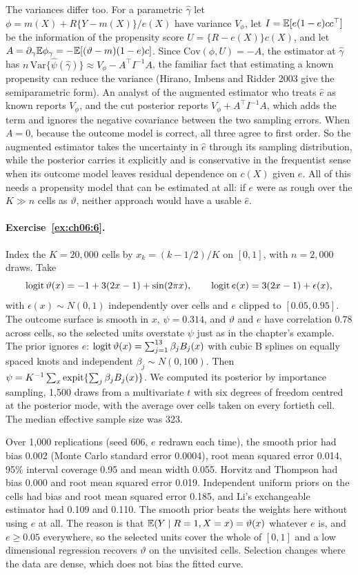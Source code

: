 The variances differ too. For a parametric $\hat\gamma$ let $\phi = m(X) + R\{Y - m(X)\}/e(X)$ have variance $V_\phi$, let $I = \mathbb{E}[e(1 - e)cc^\top]$ be the information of the propensity score $U = \{R - e(X)\}c(X)$, and let $A = \partial_\gamma\mathbb{E}\phi_\gamma = -\mathbb{E}[(\vartheta - m)(1 - e)c]$. Since $\mathrm{Cov}(\phi, U) = -A$, the estimator at $\hat\gamma$ has $n\,\mathrm{Var}\{\hat\psi(\hat\gamma)\} \approx V_\phi - A^\top I^{-1}A$, the familiar fact that estimating a known propensity can reduce the variance (Hirano, Imbens and Ridder 2003 give the semiparametric form). An analyst of the augmented estimator who treats $\hat e$ as known reports $V_\phi$, and the cut posterior reports $V_\phi + A^\top I^{-1}A$, which adds the term and ignores the negative covariance between the two sampling errors. When $A = 0$, because the outcome model is correct, all three agree to first order. So the augmented estimator takes the uncertainty in $\hat e$ through its sampling distribution, while the posterior carries it explicitly and is conservative in the frequentist sense when its outcome model leaves residual dependence on $c(X)$ given $e$. All of this needs a propensity model that can be estimated at all: if $e$ were as rough over the $K \gg n$ cells as $\vartheta$, neither approach would have a usable $\hat e$.

\paragraph{Exercise~\ref{ex:ch06:6}.} Index the $K = 20{,}000$ cells by $x_k = (k - 1/2)/K$ on $[0, 1]$, with $n = 2{,}000$ draws. Take
\[
\operatorname{logit}\vartheta(x) = -1 + 3(2x - 1) + \sin(2\pi x), \qquad \operatorname{logit} e(x) = 3(2x - 1) + \epsilon(x),
\]
with $\epsilon(x) \sim N(0, 1)$ independently over cells and $e$ clipped to $[0.05, 0.95]$. The outcome surface is smooth in $x$, $\psi = 0.314$, and $\vartheta$ and $e$ have correlation 0.78 across cells, so the selected units overstate $\psi$ just as in the chapter's example. The prior ignores $e$: $\operatorname{logit}\vartheta(x) = \sum_{j=1}^{13}\beta_jB_j(x)$ with cubic B splines on equally spaced knots and independent $\beta_j \sim N(0, 100)$. Then $\psi = K^{-1}\sum_x\operatorname{expit}\{\sum_j\beta_jB_j(x)\}$. We computed its posterior by importance sampling, 1,500 draws from a multivariate $t$ with six degrees of freedom centred at the posterior mode, with the average over cells taken on every fortieth cell. The median effective sample size was 323.

Over 1,000 replications (seed 606, $e$ redrawn each time), the smooth prior had bias 0.002 (Monte Carlo standard error 0.0004), root mean squared error 0.014, 95\% interval coverage 0.95 and mean width 0.055. Horvitz and Thompson had bias 0.000 and root mean squared error 0.019. Independent uniform priors on the cells had bias and root mean squared error 0.185, and Li's exchangeable estimator had 0.109 and 0.110. The smooth prior beats the weights here without using $e$ at all. The reason is that $\mathbb{E}(Y \mid R = 1, X = x) = \vartheta(x)$ whatever $e$ is, and $e \geq 0.05$ everywhere, so the selected units cover the whole of $[0, 1]$ and a low dimensional regression recovers $\vartheta$ on the unvisited cells. Selection changes where the data are dense, which does not bias the fitted curve.

